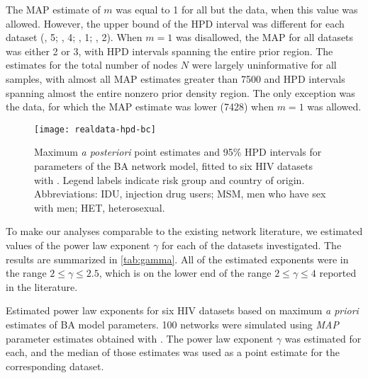 The MAP estimate of $m$ was equal to 1 for all but the
\citeauthor{novitsky2014impact} data, when this value was allowed. However, the
upper bound of the HPD interval was different for each dataset
  (\citeauthor{niculescu2015recent}, 5;
   \citeauthor{wang2015targeting}, 4;
   \citeauthor{li2015hiv}, 1;
   \citeauthor{cuevas2009hiv}, 2).
When $m = 1$ was disallowed, the MAP for all datasets was either 2 or 3, with
HPD intervals spanning the entire prior region. The estimates for the total
number of nodes $N$ were largely uninformative for all samples, with almost all
MAP estimates greater than 7500 and HPD intervals spanning almost the entire
nonzero prior density region. The only exception was the \citeauthor{li2015hiv}
data, for which the MAP estimate was lower 
  (7428)
when $m = 1$ was allowed.

\begin{figure*}[ht]
  \centering
  \texttt{[image: realdata-hpd-bc]}
  \caption[
      Maximum \textit{a posteriori} point estimates and 95\% HPD intervals for
      parameters of the BA network model, fitted to six HIV datasets
      with .]
  {
      Maximum \textit{a posteriori} point estimates and 95\% HPD intervals for
      parameters of the BA network model, fitted to six HIV datasets with
      . Legend labels indicate risk group and country of
      origin. Abbreviations: IDU, injection drug users; MSM, men who have sex
      with men; HET, heterosexual.
  }
  \label{fig:abchpd}
\end{figure*}

To make our analyses comparable to the existing network literature, we
estimated values of the power law exponent $\gamma$ for each of the datasets 
investigated. The results are summarized in \cref{tab:gamma}. All of the
estimated exponents were in the range $2 \leq \gamma \leq 2.5$, which is on the
lower end of the range $2 \leq \gamma \leq 4$ reported in the literature.

\begin{table}
    \centering
    
    \caption[
        Estimated power law exponents for six HIV datasets based on maximum
        \textit{a priori} estimates of BA model parameters.
    ]{
        Estimated power law exponents for six HIV datasets based on maximum
        \textit{a priori} estimates of BA model parameters. 100 networks were
        simulated using \textit{MAP} parameter estimates obtained with
        . The power law exponent $\gamma$ was estimated for
        each, and the median of those estimates was used as a point estimate
        for the corresponding dataset.
    }
    \label{tab:gamma}
\end{table}
